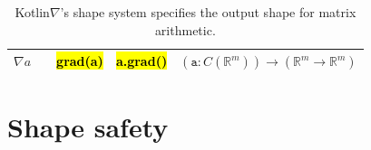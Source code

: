 \documentclass[12pt,initial,twoside,maitrise]{dms}
\newcommand{\inline}[1]{%
\begingroup%
\sethlcolor{slightgray}%
\hl{\ttfamily\small #1}%
\endgroup
}
\newcommand{\tinline}[1]{%
\begingroup%
\sethlcolor{slightgray}%
\hl{\ttfamily\tiny #1}%
\endgroup
}
\numberwithin{equation}{section}
\numberwithin{table}{chapter}
\numberwithin{figure}{chapter}
\begin{document}
{\begin{table}
\begin{tabular}{|c|c|c|c|l|}
               $\nabla a$                                      &                                                                                &  \tinline{grad(a)}                                                                       & \tinline{a.grad()}                                                                          & $                   (\texttt{a}: C(\mathbb{R}^{m})) \rightarrow (\mathbb{R}^{m}\rightarrow\mathbb{R}^{m})                                                                         $ \\ \hline
    \end{tabular}
\caption{\label{tab:shape_system}Kotlin$\nabla$'s shape system specifies the output shape for matrix arithmetic.}
\end{table}
}

\section{Shape safety}\label{sec:shape-safety}
\end{document}
